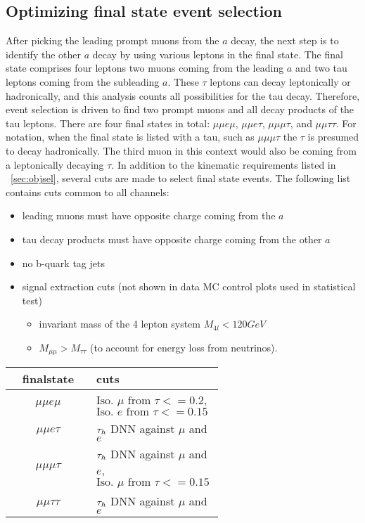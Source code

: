 \subsection{Optimizing final state event selection}
After picking the leading prompt muons from the $a$ decay, the next step is to identify the other $a$ decay by using various leptons in the final state. The final state comprises four leptons two muons coming from the leading $a$ and two tau leptons coming from the subleading $a$. These $\tau$ leptons can decay leptonically or hadronically, and this analysis counts all possibilities for the tau decay. Therefore, event selection is driven to find two prompt muons and all decay products of the tau leptons. There are four final states in total: $\mu\mu e \mu$, $\mu\mu e \tau$, $\mu\mu\mu\tau$, and $\mu\mu\tau\tau$. For notation, when the final state is listed with a tau, such as $\mu\mu\mu\tau$ the $\tau$ is presumed to decay hadronically. The third muon in this context would also be coming from a leptonically decaying $\tau$.  
In addition to the kinematic requirements listed in ~\ref{sec:objsel}, several cuts are made to select final state events. The following list contains cuts common to all channels:
\begin{itemize}
    \item leading muons must have opposite charge coming from the $a$
    \item tau decay products must have opposite charge coming from the other $a$
    \item no b-quark tag jets 
    \item signal extraction cuts (not shown in data MC control plots used in statistical test)
    \begin{itemize}
    \item invariant mass of the 4 lepton system $M_{4l}<120GeV$ 
    \item $M_{\mu\mu} > M_{\tau\tau}$ (to account for energy loss from neutrinos).
    \end{itemize}
\end{itemize}

\begin{table}[h!tbp]
\centering
{}
\begin{tabular*}{0.8\textwidth}{c|p{0.6\linewidth}}
\hline
finalstate          & cuts \\\hline 
$\mu\mu e \mu$    &    $\text{Iso. $\mu$ from $\tau$} <= 0.2$, $\text{Iso. $e$ from $\tau$} <= 0.15$       \\\hline
$\mu\mu e \tau$   &   $\tau_h$ DNN against $\mu$ and $e$        \\\hline
$\mu\mu\mu\tau$   &   $\tau_h$ DNN against $\mu$ and $e$,$\text{Iso. $\mu$ from $\tau$} <= 0.15$        \\\hline
$\mu\mu\tau\tau$  &   $\tau_h$ DNN against $\mu$ and $e$       \\\hline
\end{tabular*}
\end{table}






